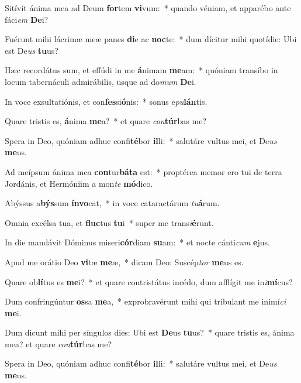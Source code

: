 \item Sitívit ánima mea ad Deum \textbf{for}tem \textbf{vi}vum:~* quando véniam, et apparébo ante fáci\textit{em} \textbf{De}i?
\item Fuérunt mihi lácrimæ meæ panes \textbf{di}e ac \textbf{noc}te:~* dum dícitur mihi quotídie: Ubi est De\textit{us} \textbf{tu}us?
\item Hæc recordátus sum, et effúdi in me \textbf{á}nimam \textbf{me}am:~* quóniam transíbo in locum tabernáculi admirábilis, usque ad do\textit{mum} \textbf{De}i.
\item In voce exsultatiónis, et con\textbf{fes}si\textbf{ó}nis:~* sonus e\textit{pu}\textbf{lán}tis.
\item Quare tristis es, \textbf{á}nima \textbf{me}a?~* et quare \textit{con}\textbf{túr}bas me?
\item Spera in Deo, quóniam adhuc confi\textbf{té}bor \textbf{il}li:~* salutáre vultus mei, et De\textit{us} \textbf{me}us.
\item Ad meípsum ánima mea \textbf{con}tur\textbf{bá}\textbf{ta} est:~* proptérea memor ero tui de terra Jordánis, et Hermóniim a mon\textit{te} \textbf{mó}dico.
\item Abýssus a\textbf{býs}sum \textbf{ín}\textbf{vo}cat,~* in voce cataractárum \textit{tu}\textbf{á}rum.
\item Omnia excélsa tua, et \textbf{fluc}tus \textbf{tu}i~* super me trans\textit{i}\textbf{é}runt.
\item In die mandávit Dóminus miseri\textbf{cór}diam \textbf{su}am:~* et nocte cánti\textit{cum} \textbf{e}jus.
\item Apud me orátio Deo \textbf{vi}tæ \textbf{me}æ,~* dicam Deo: Suscép\textit{tor} \textbf{me}us es.
\item Quare ob\textbf{lí}tus es \textbf{me}i?~* et quare contristátus incédo, dum afflígit me in\textit{i}\textbf{mí}cus?
\item Dum confringúntur \textbf{os}sa \textbf{me}a,~* exprobravérunt mihi qui tríbulant me inimí\textit{ci} \textbf{me}i.
\item Dum dicunt mihi per síngulos dies: Ubi est \textbf{De}us \textbf{tu}us?~* quare tristis es, ánima mea? et quare \textit{con}\textbf{túr}bas me?
\item Spera in Deo, quóniam adhuc confi\textbf{té}bor \textbf{il}li:~* salutáre vultus mei, et De\textit{us} \textbf{me}us.
